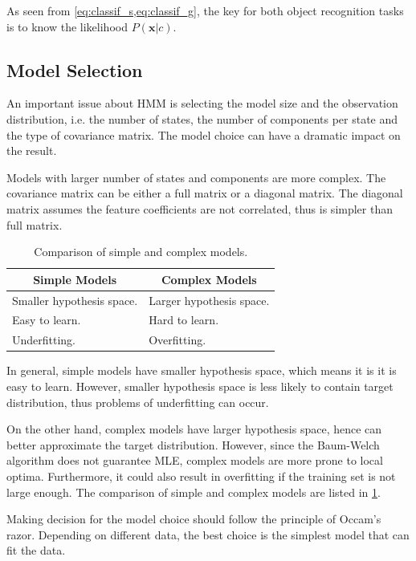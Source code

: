 \documentclass[letterpaper, 10 pt, conference]{ieeeconf}  %
\begin{document}
As seen from \cref{eq:classif_s,eq:classif_g}, the key for both object recognition tasks is to know the likelihood $P(\mathbf{x}|c)$.

\subsection{Model Selection}
An important issue about HMM is selecting the model size and the observation distribution, i.e. the number of states, the number of components per state and the type of covariance matrix. The model choice can have a dramatic impact on the result.

Models with larger number of states and components are more complex. The covariance matrix can be either a full matrix or a diagonal matrix. The diagonal matrix assumes the feature coefficients are not correlated, thus is simpler than full matrix.

\begin{table}[t]
  \caption{Comparison of simple and complex models.}
  \label{tab:model}
  \centering
  \begin{tabular}{p{.42\linewidth}p{.42\linewidth}}
    \toprule
    \multicolumn{1}{c}{\bfseries Simple Models} & \multicolumn{1}{c}{\bfseries Complex Models} \\ \midrule
    Smaller hypothesis space. & Larger hypothesis space. \\
    Easy to learn. & Hard to learn. \\
    Underfitting. & Overfitting. \\
    \bottomrule
  \end{tabular}
\end{table}

In general, simple models have smaller hypothesis space, which means it is it is easy to learn. However, smaller hypothesis space is less likely to contain target distribution, thus problems of underfitting can occur.

On the other hand, complex models have larger hypothesis space, hence can better approximate the target distribution. However, since the Baum-Welch algorithm does not guarantee MLE, complex models are more prone to local optima. Furthermore, it could also result in overfitting if the training set is not large enough. The comparison of simple and complex models are listed in \cref{tab:model}.

Making decision for the model choice should follow the principle of Occam's razor. Depending on different data, the best choice is the simplest model that can fit the data.
\end{document}
